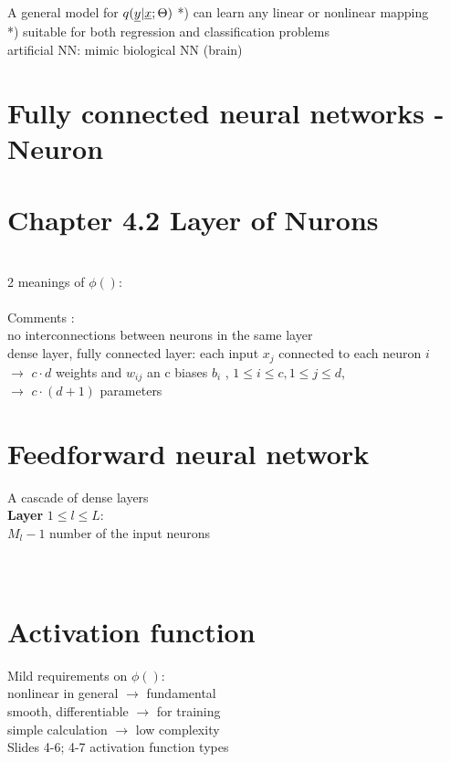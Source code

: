 
A general model for $ q (\underline{y} | \underline{x} ; \Theta ) \\
$
*) can learn any linear or nonlinear mapping  \\
*) suitable for both regression and classification problems \\
artificial NN: mimic biological NN (brain)
\section{Fully connected neural networks - Neuron}
\section{Chapter 4.2 Layer of Nurons}
\\
2 meanings of $\phi ()$: \\
 \\
Comments : \\
\textbullet no interconnections between neurons in the same layer \\
\textbullet dense layer, fully connected layer:
\qquad \textbullet each input $ x_j$ connected to each neuron $i$ \\
$\rightarrow$ $c \cdot d$ weights and $w_ {ij }$ an c biases $b_i$ , $1 \leq i \leq c, 1 \leq j \leq d$, \\
$\rightarrow$ $ c \cdot (d+1)$ parameters
\section{Feedforward neural network}
A cascade of dense layers \\
\textbf{Layer } $ 1 \leq l \leq L:$ \\
$M_l -1 $ number of the input neurons \\
 \\
  \\


\section{Activation function}
Mild requirements on $ \phi() $: \\
\textbullet nonlinear in general $ \rightarrow $ fundamental \\
\textbullet smooth, differentiable $ \rightarrow $ for training \\
\textbullet simple calculation $ \rightarrow $ low complexity \\
\textbullet Slides 4-6; 4-7 activation function types \\

